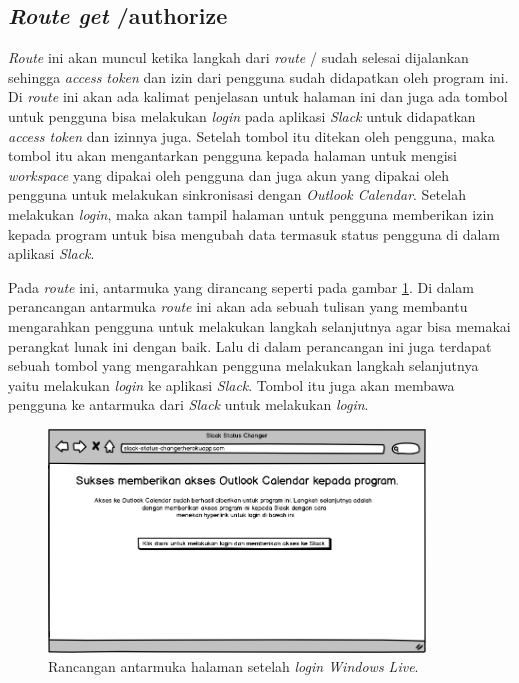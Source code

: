 \subsection{\textit{Route get} /authorize}
\label{sec:get/authorize}
\textit{Route} ini akan muncul ketika langkah dari \textit{route} / sudah selesai dijalankan sehingga \textit{access token} dan izin dari pengguna sudah didapatkan oleh program ini. Di \textit{route} ini akan ada kalimat penjelasan untuk halaman ini dan juga ada tombol untuk pengguna bisa melakukan \textit{login} pada aplikasi \textit{Slack} untuk didapatkan \textit{access token} dan izinnya juga. Setelah tombol itu ditekan oleh pengguna, maka tombol itu akan mengantarkan pengguna kepada halaman untuk mengisi \textit{workspace} yang dipakai oleh pengguna dan juga akun yang dipakai oleh pengguna untuk melakukan sinkronisasi dengan \textit{Outlook Calendar}. Setelah melakukan \textit{login}, maka akan tampil halaman untuk pengguna memberikan izin kepada program untuk bisa mengubah data termasuk status pengguna di dalam aplikasi \textit{Slack}. 

Pada \textit{route} ini, antarmuka yang dirancang seperti pada gambar \ref{fig:mockup_halaman_kedua}. Di dalam perancangan antarmuka \textit{route} ini akan ada sebuah tulisan yang membantu mengarahkan pengguna untuk melakukan langkah selanjutnya agar bisa memakai perangkat lunak ini dengan baik. Lalu di dalam perancangan ini juga terdapat sebuah tombol yang mengarahkan pengguna melakukan langkah selanjutnya yaitu melakukan \textit{login} ke aplikasi \textit{Slack}. Tombol itu juga akan membawa pengguna ke antarmuka dari \textit{Slack} untuk melakukan \textit{login}. 

\begin{figure}[h]
  \includegraphics[width=10cm]{./Gambar/MockUp/Step2.png}
  \centering
  \caption{Rancangan antarmuka halaman setelah \textit{login Windows Live}.}
  \label{fig:mockup_halaman_kedua}
\end{figure}

